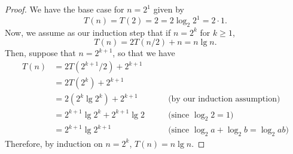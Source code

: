 \begin{proof}
  We have the base case for $n = 2^1$ given by
  \[
    T(n) = T(2) = 2 = 2\log_2{2^1} = 2 \cdot 1.
  \]
  Now, we assume as our induction step that if $n = 2^k$ for $k \geq 1$,
  \[
    T(n) = 2T(n/2) + n = n\lg{n}.
  \]
  Then, suppose that $n = 2^{k+1}$, so that we have
  \begin{align*}
    T(n) &= 2T(2^{k+1}/2) + 2^{k+1} &\, \\
    &= 2T(2^k) + 2^{k+1} &\, \\
    &= 2(2^k\lg{2^k}) + 2^{k+1} \qquad
    &\text{(by our induction assumption)} \\
    &= 2^{k+1}\lg{2^k} + 2^{k+1}\lg{2} \qquad
    &\text{(since $\log_2{2} = 1$)} \\
    &= 2^{k+1}\lg{2^{k+1}} \qquad
    &\text{(since $\log_2{a} + \log_2{b} = \log_2{ab}$)}
  \end{align*}
  Therefore, by induction on $n = 2^k$, $T(n) = n\lg{n}$.
\end{proof}
